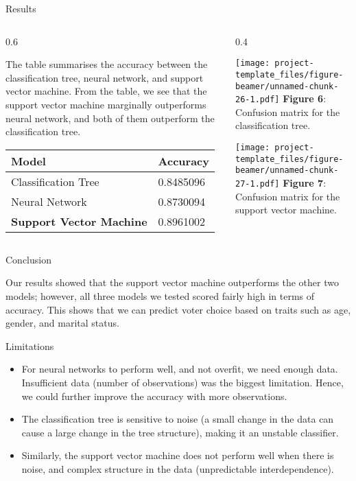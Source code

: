 \documentclass[
  ignorenonframetext,
]{beamer}
\def\begincols{\begin{columns}}
\def\begincol{\begin{column}}
\def\endcol{\end{column}}
\def\endcols{\end{columns}}
\begin{document}
\begin{frame}{Results}
\protect\hypertarget{results}{}

\begincols
\begincol{0.6\textwidth}

The table summarises the accuracy between the classification tree,
neural network, and support vector machine. From the table, we see that
the support vector machine marginally outperforms neural network, and
both of them outperform the classification tree.

\begin{longtable}[]{@{}ll@{}}
\toprule
Model & Accuracy\tabularnewline
\midrule
\endhead
Classification Tree & 0.8485096\tabularnewline
Neural Network & 0.8730094\tabularnewline
\textbf{Support Vector Machine} & 0.8961002\tabularnewline
\bottomrule
\end{longtable}

\endcol
\begincol{0.4\textwidth}
\fontsize{6}{7.2}\selectfont

\texttt{[image: project-template\_files/figure-beamer/unnamed-chunk-26-1.pdf]}
\textbf{Figure 6}: Confusion matrix for the classification tree.

\texttt{[image: project-template\_files/figure-beamer/unnamed-chunk-27-1.pdf]}
\textbf{Figure 7}: Confusion matrix for the support vector machine.

\endcol
\endcols

\end{frame}

\begin{frame}{Conclusion}
\protect\hypertarget{conclusion}{}

Our results showed that the support vector machine outperforms the other
two models; however, all three models we tested scored fairly high in
terms of accuracy. This shows that we can predict voter choice based on
traits such as age, gender, and marital status.

\begin{block}{Limitations}

\begin{itemize}
\item
  For neural networks to perform well, and not overfit, we need enough
  data. Insufficient data (number of observations) was the biggest
  limitation. Hence, we could further improve the accuracy with more
  observations.
\item
  The classification tree is sensitive to noise (a small change in the
  data can cause a large change in the tree structure), making it an
  unstable classifier.
\item
  Similarly, the support vector machine does not perform well when there
  is noise, and complex structure in the data (unpredictable
  interdependence).
\end{itemize}

\end{block}

\end{frame}
\end{document}
